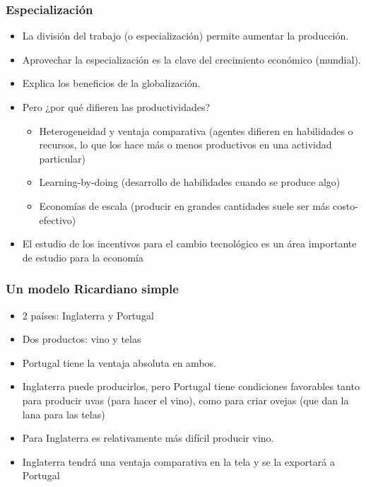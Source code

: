 \documentclass{beamer}
\begin{document}
\begin{frame}
    \frametitle{Especialización}
    \begin{itemize}
        \item La división del trabajo (o especialización) permite aumentar la producción.
        \item Aprovechar la especialización es la clave del crecimiento económico (mundial).
        \item Explica los beneficios de la globalización.
    \item Pero ¿por qué difieren las productividades?

        \begin{itemize}\vspace{2mm}
            \item Heterogeneidad y ventaja comparativa (agentes difieren en habilidades o recursos, lo que los hace más o menos productivos en una actividad particular)
            \item Learning-by-doing (desarrollo de habilidades cuando se produce algo) \vspace{2mm}
            \item Economías de escala (producir en grandes cantidades suele ser más costo-efectivo) \vspace{2mm}
        
        \end{itemize}
            \item El estudio de los incentivos para el cambio tecnológico es un área importante de estudio para la economía
    \end{itemize} 
\end{frame}

\begin{frame}
    \frametitle{Un modelo Ricardiano simple}
    \begin{itemize}
        \item 2 países: Inglaterra y Portugal
        \item Dos productos: vino y telas
        \item Portugal tiene la ventaja absoluta en ambos.
        \item Inglaterra puede producirlos, pero Portugal tiene condiciones favorables tanto para producir uvas (para hacer el vino), como para criar ovejas (que dan la lana para las telas)
        \item Para Inglaterra es relativamente más difícil producir vino.
        \item Inglaterra tendrá una ventaja comparativa en la tela y se la exportará a Portugal
    \end{itemize} 
\end{frame}
\end{document}
